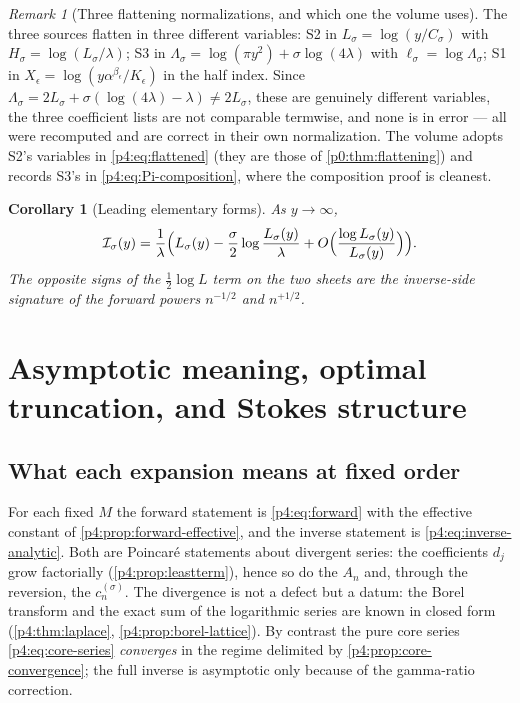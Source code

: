 \documentclass[11pt,a4paper,oneside]{book}
\theoremstyle{plain}
\newtheorem{corollary}[theorem]{Corollary}
\theoremstyle{definition}
\theoremstyle{remark}
\newtheorem{remark}[theorem]{Remark}
\begin{document}
\begin{remark}[Three flattening normalizations, and which one the volume uses]
\label{p4:rem:three-flattenings}
The three sources flatten in three different variables: \textsf{S2} in
$L_\sigma=\log(y/C_\sigma)$ with $H_\sigma=\log(L_\sigma/\lambda)$;
\textsf{S3} in $\Lambda_\sigma=\log(\pi y^{2})+\sigma\log(4\lambda)$ with
$\ell_\sigma=\log\Lambda_\sigma$; \textsf{S1} in
$X_\epsilon=\log(y\alpha^{\beta_\epsilon}/K_\epsilon)$ in the half index.
Since $\Lambda_\sigma=2L_\sigma+\sigma(\log(4\lambda)-\lambda)\ne2L_\sigma$,
these are genuinely different variables, the three coefficient lists are not
comparable termwise, and none is in error --- all were recomputed and are
correct in their own normalization.  The volume adopts \textsf{S2}'s variables
in \cref{p4:eq:flattened} (they are those of \cref{p0:thm:flattening}) and
records \textsf{S3}'s in \cref{p4:eq:Pi-composition}, where the composition
proof is cleanest.
\end{remark}

\begin{corollary}[Leading elementary forms]
\label{p4:cor:leading-inverse}
As $y\to\infty$,
\begin{equation}
  \mathcal I_\sigma(y)=\frac1\lambda\Bigl(L_\sigma(y)
   -\frac\sigma2\log\frac{L_\sigma(y)}{\lambda}
   +O\Bigl(\frac{\log L_\sigma(y)}{L_\sigma(y)}\Bigr)\Bigr).
  \label{p4:eq:leading-inverse}
\end{equation}
The opposite signs of the $\tfrac12\log L$ term on the two sheets are the
inverse-side signature of the forward powers $n^{-1/2}$ and $n^{+1/2}$.
\end{corollary}

\section{Asymptotic meaning, optimal truncation, and Stokes structure}
\label{p4:sec:stokes}

\subsection{What each expansion means at fixed order}

For each fixed $M$ the forward statement is \cref{p4:eq:forward} with the
effective constant of \cref{p4:prop:forward-effective}, and the inverse
statement is \cref{p4:eq:inverse-analytic}.  Both are Poincar\'e statements
about divergent series: the coefficients $d_j$ grow factorially
(\cref{p4:prop:leastterm}), hence so do the $A_n$ and, through the reversion,
the $c^{(\sigma)}_n$.  The divergence is not a defect but a datum: the Borel
transform and the exact sum of the logarithmic series are known in closed form
(\cref{p4:thm:laplace}, \cref{p4:prop:borel-lattice}).  By contrast the pure
core series \cref{p4:eq:core-series} \emph{converges} in the regime delimited
by \cref{p4:prop:core-convergence}; the full inverse is asymptotic only
because of the gamma-ratio correction.
\end{document}

